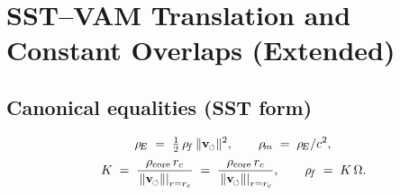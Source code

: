 \documentclass[11pt]{article}
\newcommand{\swirlarrow}{%
	\mathchoice{\mkern-2mu\scriptstyle\boldsymbol{\circlearrowleft}}%
	{\mkern-2mu\scriptstyle\boldsymbol{\circlearrowleft}}%
	{\mkern-2mu\scriptscriptstyle\boldsymbol{\circlearrowleft}}%
	{\mkern-2mu\scriptscriptstyle\boldsymbol{\circlearrowleft}}%
}
\newcommand{\vswirl}{\mathbf{v}_{\swirlarrow}}
\newcommand{\vscore}{v_s}                                %
\newcommand{\vnorm}{\lVert \vswirl \rVert}               %
\newcommand{\rhoF}{\rho_{\!f}}                           %
\newcommand{\rhoE}{\rho_{\!E}}                           %
\newcommand{\rhoM}{\rho_{\!m}}                           %
\newcommand{\rhoC}{\rho_{\mathrm{core}}} %
\providecommand{\rc}{r_c} %
\newcommand{\vcore}{\left.\vnorm\right|_{r=\rc}}        %
\renewcommand{\vscore}{\vcore}
\begin{document}
	\titlepageOpen

	\begin{abstract}
		\noindent
		This note provides a rigorous nomenclature concordance between the legacy VAM presentation and the Swirl--String Theory (SST) house style. It establishes a one-to-one mapping of symbols and terminology while preserving the underlying kinematics, operators, and calibrated constants. In particular, it fixes the canonical SST equalities
		\[
			\rhoE=\tfrac12\,\rhoF\,\vnorm^{2},\qquad
			\rhoM=\rhoE/c^{2},\qquad
			K=\frac{\rhoC\, r_c}{\vscore}\;=\;\frac{\rhoC\,\rc}{\left.\vnorm\right|_{r=\rc}},\quad
			\rhoF=K\,\Omega,
		\]
		and records that all published numerical values for $\vscore$ (defined here as $\left.\lVert\vswirl\rVert\right|_{r=\rc}$), $r_c$, $\rhoC$, the background density, and the sectoral force bounds carry over unchanged. The document includes compact translation tables (fields/kinematics/operators; densities/velocities/coarse--graining; global scales) and a minimal macro layer (\verb|\rhoF|, \verb|\rhoE|, \verb|\rhoM|, \verb|\rhoC|, \verb|\vswirl|, \verb|\vnorm|) to prevent notation drift in large projects. Legacy wording is restricted to historical citations; narrative prose adopts the neutral SST vocabulary (e.g., \emph{foliation}, \emph{swirl string}) without altering the mathematics. Compatibility is ensured both for standalone use (title page + metadata) and for modular inclusion (\verb|\providecommand| guards and no additional package requirements). The result is a drop-in “translation guide’’ that guarantees dimensional consistency, unambiguous symbol usage, and reproducible cross-referencing across manuscripts that span the VAM$\to$SST transition.
	\end{abstract}

	\titlepageClose


	\section{SST--VAM Translation and Constant Overlaps (Extended)}

	\subsection*{Canonical equalities (SST form)}
	\[
		\rhoE \;=\; \tfrac12\,\rhoF\,\vnorm^{2},\qquad
		\rhoM \;=\; \rhoE/c^{2},
	\]
	\[
		K \;=\; \frac{\rhoC\, r_c}{\vscore}\;=\;\frac{\rhoC\,\rc}{\left.\vnorm\right|_{r=\rc}},\qquad
		\rhoF \;=\; K\,\Omega .
	\]
\end{document}
